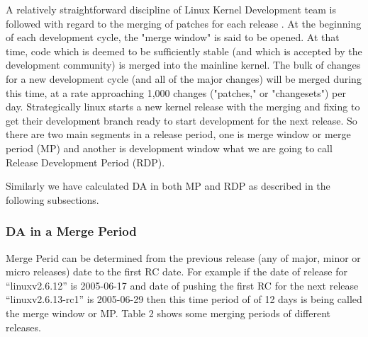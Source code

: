 \documentclass{acm_proc_article-sp}
\begin{document}
A relatively straightforward discipline of Linux Kernel Development team is followed with regard to the merging of patches for each release \cite{14_kernel}.  At the beginning of each development cycle, the "merge window" is said to be opened.  At that time, code which is deemed to be sufficiently stable (and which is accepted by the development community) is merged into the mainline kernel. The bulk of changes for a new development cycle (and all of the major changes) will be merged during this time, at a rate approaching 1,000 changes ("patches," or "changesets") per day. Strategically linux starts a new kernel release with the merging and fixing to get their development branch ready to start development for the next release. So there are two main segments in a release period, one is merge window or merge period (MP) and another is development window what we are going to call Release Development Period (RDP).

Similarly we have calculated DA in both MP and RDP as described in the following subsections.

\subsubsection{DA in a Merge Period}
Merge Perid can be determined from the previous release (any of major, minor or micro releases) date to the first RC date. For example if the date of release for ``linuxv2.6.12''  is 2005-06-17 and date of pushing the first RC for the next release ``linuxv2.6.13-rc1'' is 2005-06-29 then this time period of of 12 days is being called the merge window \cite{14_kernel} or MP. Table 2 shows some merging periods of different releases.
\end{document}
